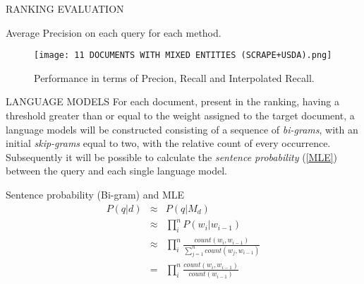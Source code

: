 \begin{frame}{RANKING EVALUATION}
\begin{minipage}{\linewidth}
\begin{minipage}{0.50\linewidth}
\begin{table}[]
                \caption{Average Precision on each query for each method.}
                \label{avgp}
                \centering
            \end{table}
        \end{minipage}
        \begin{minipage}{0.40\linewidth}
            \begin{figure}[htbp]
                \centering
                \texttt{[image: 11 DOCUMENTS WITH MIXED ENTITIES (SCRAPE+USDA).png]}
                \centering
                \caption{Performance in terms of Precion, Recall and Interpolated Recall.}
                \label{Performance mixed approach}
                \centering
            \end{figure}
        \end{minipage}
    \end{minipage}
\end{frame}

\begin{frame}{LANGUAGE MODELS}
    For each document, present in the ranking, having a threshold greater 
    than or equal to the weight assigned to the target document, a language 
    models will be constructed consisting of a sequence of \emph{bi-grams}, with an 
    initial \emph{skip-grams} equal to two, with the relative count of every 
    occurrence. Subsequently it will be possible to calculate the \emph{sentence 
    probability} (\ref{MLE}) between the query and each single language model.   
    \begin{block}{\centering Sentence probability (Bi-gram) and MLE}
        \begin{eqnarray}\label{MLE}
            P(q|d) & \approx & P(q|M_d) \nonumber \\
                   & \approx & \prod_i^n{P(w_i|w_{i-1})} \nonumber \\
                   & \approx & \prod_i^n\frac{count(w_i,w_{i-1})}{\sum_{j=1}^n count(w_j,w_{i-1})} \nonumber \\
                   & = & \prod_i^n\frac{count(w_i, w_{i-1})}{count(w_{i-1})}
        \end{eqnarray}
    \end{block}
\end{frame}


